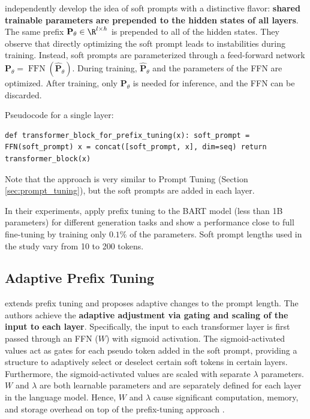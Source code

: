 \citet{prefix_tuning} independently develop the idea of soft prompts with a distinctive flavor: \textbf{shared trainable parameters are prepended to the hidden states of all layers}. The same prefix $\mathbf{P}_\theta \in \R^{l \times h}$ is prepended to all of the hidden states. They observe that directly optimizing the soft prompt leads to instabilities during training. Instead, soft prompts are parameterized through a feed-forward network $\mathbf{P}_\theta = \operatorname{FFN}(\hat{\mathbf{P}}_\theta)$. During training, $\hat{\mathbf{P}}_\theta$ and the parameters of the FFN are optimized. After training, only $\mathbf{P}_\theta$ is needed for inference, and the FFN can be discarded.

Pseudocode for a single layer:

\begin{lstlisting}
def transformer_block_for_prefix_tuning(x): soft_prompt = FFN(soft_prompt) x = concat([soft_prompt, x], dim=seq) return transformer_block(x)
\end{lstlisting}

Note that the approach is very similar to Prompt Tuning (Section \ref{sec:prompt_tuning}), but the soft prompts are added in each layer.

In their experiments, \citet{prefix_tuning} apply prefix tuning to the BART \citep{lewis2019bart} model (less than 1B parameters) for different generation tasks and show a performance close to full fine-tuning by training only $0.1\%$ of the parameters. Soft prompt lengths used in the study vary from 10 to 200 tokens.

\subsection{Adaptive Prefix Tuning}

\citet{zhang2023towards} extends prefix tuning and proposes adaptive changes to the prompt length. The authors achieve the \textbf{adaptive adjustment via gating and scaling of the input to each layer}. Specifically, the input to each transformer layer is first passed through an FFN ($W$) with sigmoid activation. The sigmoid-activated values act as gates for each pseudo token added in the soft prompt, providing a structure to adaptively select or deselect certain soft tokens in certain layers. Furthermore, the sigmoid-activated values are scaled with separate $\lambda$ parameters. $W$ and $\lambda$ are both learnable parameters and are separately defined for each layer in the language model. Hence, $W$ and $\lambda$ cause significant computation, memory, and storage overhead on top of the prefix-tuning approach \citep{prefix_tuning}.

